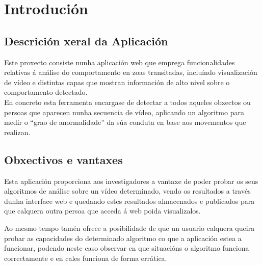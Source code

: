 \documentclass[11pt, a4paper, twoside, titlepage]{book}
\begin{document}
\pagestyle{empty}


\cleardoublepage


\pagestyle{fancy}
\renewcommand{\chaptermark}[1]{%
\markboth{\thechapter.\ #1}{}}
\renewcommand{\sectionmark}[1]{%
\markright{\thesection.\ #1}{}}
\fancyhead{}
\fancyhead[LE,RO]{\thepage}
\fancyhead[LO,ER]{\rightmark}
\fancyfoot{}

\chapter{Introdución}
    \section{Descrición xeral da Aplicación}

        Este proxecto consiste nunha aplicación web que emprega funcionalidades relativas á análise do
        comportamento en zoas transitadas, incluíndo visualización de vídeo e distintas capas que
        mostran información de alto nivel sobre o comportamento detectado.\\

        En concreto esta ferramenta encargase de detectar a todos aqueles obxectos ou persoas que 
        aparecen nunha secuencia de vídeo, aplicando un algoritmo para medir o ``grao de anormalidade''
        da súa conduta en base aos movementos que realizan.\\

    \section{Obxectivos e vantaxes}
        Esta aplicación proporciona aos investigadores a vantaxe de poder probar os seus algoritmos de
        análise sobre un vídeo determinado, vendo os resultados a través dunha interface web e 
        quedando estes resultados almacenados e publicados para que calquera outra persoa que
        acceda á web poida visualizalos.
        
        Ao mesmo tempo tamén ofrece a posibilidade de que un usuario calquera queira probar as 
        capacidades do determinado algoritmo co que a aplicación estea a funcionar, podendo neste
        caso observar en que situacións o algoritmo funciona correctamente e en cales funciona de 
        forma errática.
        
\end{document}
